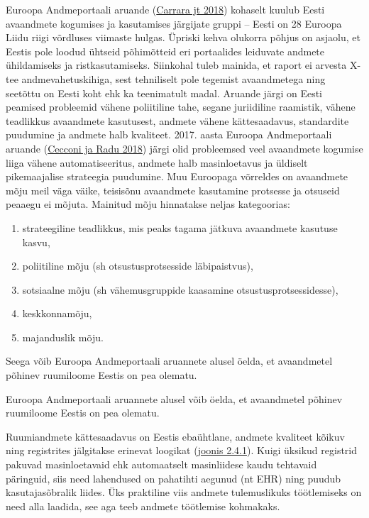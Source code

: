 \documentclass[estonian,]{article}
\providecommand{\tightlist}{%
  \setlength{\itemsep}{0pt}\setlength{\parskip}{0pt}}
\begin{document}
Euroopa Andmeportaali aruande (\protect\hyperlink{Carrara2018}{Carrara jt 2018}) kohaselt kuulub Eesti avaandmete kogumises ja kasutamises järgijate gruppi -- Eesti on 28 Euroopa Liidu riigi võrdluses viimaste hulgas. Üpriski kehva olukorra põhjus on asjaolu, et Eestis pole loodud ühtseid põhimõtteid eri portaalides leiduvate andmete ühildamiseks ja ristkasutamiseks. Siinkohal tuleb mainida, et raport ei arvesta X-tee andmevahetuskihiga, sest tehniliselt pole tegemist avaandmetega ning seetõttu on Eesti koht ehk ka teenimatult madal. Aruande järgi on Eesti peamised probleemid vähene poliitiline tahe, segane juriidiline raamistik, vähene teadlikkus avaandmete kasutusest, andmete vähene kättesaadavus, standardite puudumine ja andmete halb kvaliteet. 2017. aasta Euroopa Andmeportaali aruande (\protect\hyperlink{Cecconi2018}{Cecconi ja Radu 2018}) järgi olid probleemsed veel avaandmete kogumise liiga vähene automatiseeritus, andmete halb masinloetavus ja üldiselt pikemaajalise strateegia puudumine. Muu Euroopaga võrreldes on avaandmete mõju meil väga väike, teisisõnu avaandmete kasutamine protsesse ja otsuseid peaaegu ei mõjuta. Mainitud mõju hinnatakse neljas kategoorias:

\begin{enumerate}
\def\labelenumi{\arabic{enumi})}
\tightlist
\item
  strateegiline teadlikkus, mis peaks tagama jätkuva avaandmete kasutuse kasvu,
\item
  poliitiline mõju (sh otsustusprotsesside läbipaistvus),
\item
  sotsiaalne mõju (sh vähemusgruppide kaasamine otsustusprotsessidesse),
\item
  keskkonnamõju,
\item
  majanduslik mõju.
\end{enumerate}

Seega võib Euroopa Andmeportaali aruannete alusel öelda, et avaandmetel põhinev ruumiloome Eestis on pea olematu.

\begin{blockquote-right}
Euroopa Andmeportaali aruannete alusel võib öelda, et avaandmetel
põhinev ruumiloome Eestis on pea olematu.
\end{blockquote-right}

Ruumiandmete kättesaadavus on Eestis ebaühtlane, andmete kvaliteet kõikuv ning registrites jälgitakse erinevat loogikat (\protect\hyperlink{figure241}{joonis 2.4.1}). Kuigi üksikud registrid pakuvad masinloetavaid ehk automaatselt masinliidese kaudu tehtavaid päringuid, siis need lahendused on pahatihti aegunud (nt EHR) ning puudub kasutajasõbralik liides. Üks praktiline viis andmete tulemuslikuks töötlemiseks on need alla laadida, see aga teeb andmete töötlemise kohmakaks.
\end{document}
